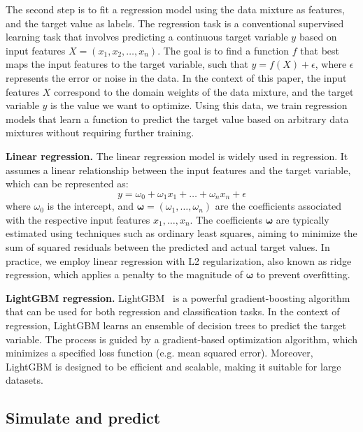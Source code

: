 The second step is to fit a regression model using the data mixture as features, and the target value as labels.
The regression task is a conventional supervised learning task that involves predicting a continuous target variable $y$ based on input features $X = (x_1, x_2, \ldots, x_n)$. The goal is to find a function $f$ that best maps the input features to the target variable, such that $y=f(X) +\epsilon$, where $\epsilon$ represents the error or noise in the data. In the context of this paper, the input features $X$ correspond to the domain weights of the data mixture, and the target variable $y$ is the value we want to optimize. Using this data, we train regression models that learn a function to predict the target value based on arbitrary data mixtures without requiring further training.

\textbf{Linear regression.}\;\;
The linear regression model is widely used in regression. It assumes a linear relationship between the input features and the target variable, which can be represented as:
\begin{equation}
y = \omega_0 + \omega_1 x_1 + \ldots + \omega_n x_n + \epsilon
\end{equation}
where $\omega_0$ is the intercept, and $\boldsymbol{\omega}=(\omega_1, \ldots, \omega_n)$ are the coefficients associated with the respective input features $x_1, \ldots, x_n$.
The coefficients $\boldsymbol{\omega}$ are typically estimated using techniques such as ordinary least squares, aiming to minimize the sum of squared residuals between the predicted and actual target values. In practice, we employ linear regression with L2 regularization, also known as ridge regression, which applies a penalty to the magnitude of $\boldsymbol{\omega}$ to prevent overfitting.

\textbf{LightGBM regression.}\;\;
LightGBM~\citep{ke2017lightgbm} is a powerful gradient-boosting algorithm that can be used for both regression and classification tasks. In the context of regression, LightGBM learns an ensemble of decision trees to predict the target variable. 
The process is guided by a gradient-based optimization algorithm, which minimizes a specified loss function (e.g. mean squared error). Moreover, LightGBM is designed to be efficient and scalable, making it suitable for large datasets.

\subsection{Simulate and predict}


